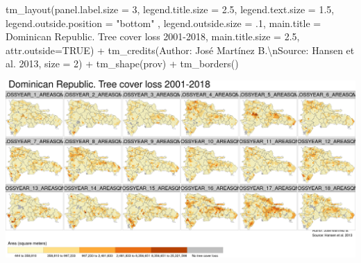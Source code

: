 \documentclass[10pt,landscape,a3paper]{article}
\newenvironment{Shaded}{\begin{snugshade}}{\end{snugshade}}
\newcommand{\AttributeTok}[1]{\textcolor[rgb]{0.77,0.63,0.00}{#1}}
\newcommand{\ConstantTok}[1]{\textcolor[rgb]{0.00,0.00,0.00}{#1}}
\newcommand{\DecValTok}[1]{\textcolor[rgb]{0.00,0.00,0.81}{#1}}
\newcommand{\FloatTok}[1]{\textcolor[rgb]{0.00,0.00,0.81}{#1}}
\newcommand{\FunctionTok}[1]{\textcolor[rgb]{0.00,0.00,0.00}{#1}}
\newcommand{\NormalTok}[1]{#1}
\newcommand{\SpecialCharTok}[1]{\textcolor[rgb]{0.00,0.00,0.00}{#1}}
\newcommand{\StringTok}[1]{\textcolor[rgb]{0.31,0.60,0.02}{#1}}
\begin{document}
\begin{Shaded}
\begin{Highlighting}[]
  \FunctionTok{tm\_layout}\NormalTok{(}\AttributeTok{panel.label.size =} \DecValTok{3}\NormalTok{, }\AttributeTok{legend.title.size =} \FloatTok{2.5}\NormalTok{, }\AttributeTok{legend.text.size =} \FloatTok{1.5}\NormalTok{,}
            \AttributeTok{legend.outside.position =} \StringTok{"bottom"}\NormalTok{ , }\AttributeTok{legend.outside.size =}\NormalTok{ .}\DecValTok{1}\NormalTok{,}
            \AttributeTok{main.title =} \StringTok{\textquotesingle{}Dominican Republic. Tree cover loss 2001{-}2018\textquotesingle{}}\NormalTok{,}
            \AttributeTok{main.title.size =} \FloatTok{2.5}\NormalTok{, }\AttributeTok{attr.outside=}\ConstantTok{TRUE}\NormalTok{) }\SpecialCharTok{+} 
  \FunctionTok{tm\_credits}\NormalTok{(}\StringTok{\textquotesingle{}Author: José Martínez B.}\SpecialCharTok{\textbackslash{}n}\StringTok{Source: Hansen et al. 2013\textquotesingle{}}\NormalTok{, }\AttributeTok{size =} \DecValTok{2}\NormalTok{) }\SpecialCharTok{+}
  \FunctionTok{tm\_shape}\NormalTok{(prov) }\SpecialCharTok{+} \FunctionTok{tm\_borders}\NormalTok{()}
\end{Highlighting}
\end{Shaded}

\begin{center}\includegraphics{img/zonal-long-term-grid-5} \end{center}
\end{document}
